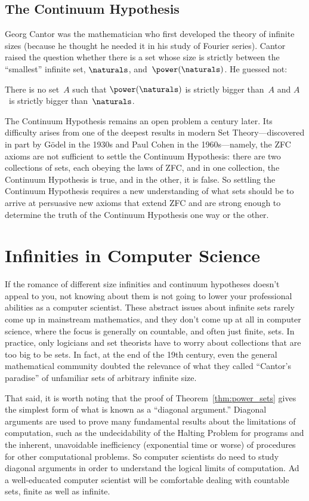 \subsection{The Continuum Hypothesis}

Georg Cantor was the mathematician who first developed the theory of
infinite sizes (because he thought he needed it in his study of
Fourier series).  Cantor raised the question whether there is a set
whose size is strictly between the ``smallest'' infinite set,
$\naturals$, and~$\power(\naturals)$. He guessed not:
\begin{cont_hypo*}
There is no set~$A$ such that $\power(\naturals)$ is strictly bigger
than~$A$ and $A$~is strictly bigger than~$\naturals$.
\end{cont_hypo*}

The Continuum Hypothesis remains an open problem a century later.  Its
difficulty arises from one of the deepest results in modern Set
Theory---discovered in part by G\"odel in the 1930s and Paul Cohen in
the 1960s---namely, the ZFC axioms are not sufficient to settle the
Continuum Hypothesis: there are two collections of sets, each obeying
the laws of ZFC, and in one collection, the Continuum Hypothesis is
true, and in the other, it is false.  So settling the Continuum
Hypothesis requires a new understanding of what sets should be to
arrive at persuasive new axioms that extend ZFC and are strong enough
to determine the truth of the Continuum Hypothesis one way or the
other.

\section{Infinities in Computer Science}

If the romance of different size infinities and continuum hypotheses
doesn't appeal to you, not knowing about them is not going to lower
your professional abilities as a computer scientist.  These abstract
issues about infinite sets rarely come up in mainstream mathematics,
and they don't come up at all in computer science, where the focus is
generally on countable, and often just finite, sets.  In practice,
only logicians and set theorists have to worry about collections that
are too big to be sets.  In fact, at the end of the 19th century, even
the general mathematical community doubted the relevance of what they
called ``Cantor's paradise'' of unfamiliar sets of arbitrary infinite
size.

That said, it is worth noting that the proof of
Theorem~\ref{thm:power_sets} gives the simplest form of what is known
as a ``diagonal argument.''  Diagonal arguments are used to prove many
fundamental results about the limitations of computation, such as the
undecidability of the Halting Problem for programs and the inherent,
unavoidable inefficiency (exponential time or worse) of procedures for
other computational problems.  So computer scientists do need to study
diagonal arguments in order to understand the logical limits of
computation.  Ad a well-educated computer scientist will be
comfortable dealing with countable sets, finite as well as infinite.

\problemsection

\endinput
